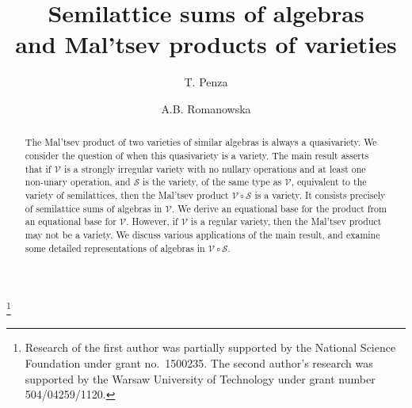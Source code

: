 \documentclass{birkau}
\newcommand{\mcV}{\mathcal{V}}
\newcommand{\mcS}{\mathcal{S}}
\theoremstyle{plain}
\theoremstyle{definition}
\numberwithin{equation}{section}
\begin{document}
\title[Semilattice sums of algebras]{Semilattice sums of algebras\\ and Mal'tsev products of varieties}

\address{ Department of Mathematics\\
Iowa State University\\
Ames, Iowa, 50011, USA}

\author[T. Penza]{T. Penza}
\address{Faculty of Mathematics and Information Science\\
Warsaw University of Technology\\
00-661 Warsaw, Poland}

\author[A.B. Romanowska]{A.B. Romanowska}
\address{Faculty of Mathematics and Information Science\\
Warsaw University of Technology\\
00-661 Warsaw, Poland}

\thanks{Research of the first author was partially supported by the National Science Foundation under grant
no.~1500235.
The second author's research was supported by the Warsaw University of Technology under grant number 504/04259/1120.}





\begin{abstract}
The Mal'tsev product of two varieties of similar
algebras is always a quasivariety. We consider the question of when
this quasivariety is a variety. The main result asserts that
if $\mcV$ is a strongly irregular variety with no nullary operations and at least one
non-unary operation, and $\mcS$
is the variety, of the same type as $\mcV$, equivalent to the variety of
semilattices, then the Mal'tsev product $\mcV \circ \mcS$ is a variety.
It consists precisely of semilattice sums of algebras in $\mcV$.
We derive an equational base for the product from an
equational base for $\mcV$. However, if
$\mcV$ is a regular variety, then the Mal'tsev product may not be a
variety. We discuss  various applications of the main result,
and examine some detailed representations of algebras in $\mcV
\circ \mcS$.
\end{abstract}
\end{document}
